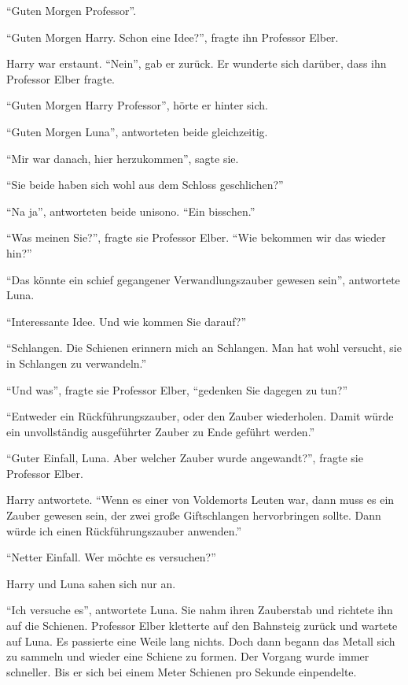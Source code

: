 \enquote{Guten Morgen Professor}.

\enquote{Guten Morgen Harry. Schon eine Idee?}, fragte ihn Professor Elber.

Harry war erstaunt. \enquote{Nein}, gab er zurück. Er wunderte sich darüber, dass ihn Professor Elber fragte.

\enquote{Guten Morgen Harry \gst Professor}, hörte er hinter sich.

\enquote{Guten Morgen Luna}, antworteten beide gleichzeitig.

\enquote{Mir war danach, hier herzukommen}, sagte sie.

\enquote{Sie beide haben sich wohl aus dem Schloss geschlichen?}

\enquote{Na ja}, antworteten beide unisono. \enquote{Ein bisschen.}

\enquote{Was meinen Sie?}, fragte sie Professor Elber. \enquote{Wie bekommen wir das wieder hin?}

\enquote{Das könnte ein schief gegangener Verwandlungszauber gewesen sein}, antwortete Luna.

\enquote{Interessante Idee. Und wie kommen Sie darauf?}

\enquote{Schlangen. Die Schienen erinnern mich an Schlangen. \gst Man hat wohl versucht, sie in Schlangen zu verwandeln.}

\enquote{Und was}, fragte sie Professor Elber, \enquote{gedenken Sie dagegen zu tun?}

\enquote{Entweder ein Rückführungszauber, oder den Zauber wiederholen. Damit würde ein unvollständig ausgeführter Zauber zu Ende geführt werden.}

\enquote{Guter Einfall, Luna. Aber welcher Zauber wurde angewandt?}, fragte sie Professor Elber.

Harry antwortete. \enquote{Wenn es einer von Voldemorts Leuten war, dann muss es ein Zauber gewesen sein, der zwei große Giftschlangen hervorbringen sollte. Dann würde ich einen Rückführungszauber anwenden.}

\enquote{Netter Einfall. Wer möchte es versuchen?}

Harry und Luna sahen sich nur an.

\enquote{Ich versuche es}, antwortete Luna. Sie nahm ihren Zauberstab und richtete ihn auf die Schienen. Professor Elber kletterte auf den Bahnsteig zurück und wartete auf Luna.  Es passierte eine Weile lang nichts. Doch dann begann das Metall sich zu sammeln und wieder eine Schiene zu formen. Der Vorgang wurde immer schneller. Bis er sich bei einem Meter Schienen pro Sekunde einpendelte.

